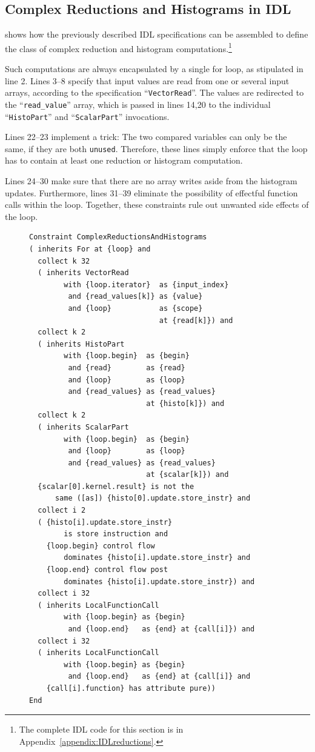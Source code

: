 \subsection{Complex Reductions and Histograms in IDL}

     shows how the previously described IDL specifications
    can be assembled to define the class of complex reduction and histogram
    computations.\footnote{The complete IDL code for this section is in
    Appendix~\ref{appendix:IDLreductions}.}

    Such computations are always encapsulated by a single for loop, as
    stipulated in line 2.
    Lines 3--8 specify that input values are read from one or several input
    arrays, according to the specification ``{\tt VectorRead}''.
    The values are redirected to the ``{\tt read\_value}'' array, which is
    passed in lines 14,20 to the individual ``{\tt HistoPart}'' and
    ``{\tt ScalarPart}'' invocations.

    Lines 22--23 implement a trick: The two compared variables can only be the
    same, if they are both {\tt unused}.
    Therefore, these lines simply enforce that the loop has to contain at least
    one reduction or histogram computation.

    Lines 24--30 make sure that there are no array writes aside from the
    histogram updates.
    Furthermore, lines 31--39 eliminate the possibility of effectful function
    calls within the loop.
    Together, these constraints rule out unwanted side effects of the loop.

\begin{figure}[p]
\begin{lstlisting}[language=IDL,label={IDLcomplexred},caption=
   {Complex reductions and histograms as an IDL specification}]
Constraint ComplexReductionsAndHistograms
( inherits For at {loop} and
  collect k 32
  ( inherits VectorRead
        with {loop.iterator}  as {input_index}
         and {read_values[k]} as {value}
         and {loop}           as {scope}
                              at {read[k]}) and
  collect k 2
  ( inherits HistoPart
        with {loop.begin}  as {begin}
         and {read}        as {read}
         and {loop}        as {loop}
         and {read_values} as {read_values}
                           at {histo[k]}) and
  collect k 2
  ( inherits ScalarPart
        with {loop.begin}  as {begin}
         and {loop}        as {loop}
         and {read_values} as {read_values}
                           at {scalar[k]}) and
  {scalar[0].kernel.result} is not the
      same ([as]) {histo[0].update.store_instr} and
  collect i 2
  ( {histo[i].update.store_instr}
        is store instruction and
    {loop.begin} control flow
        dominates {histo[i].update.store_instr} and
    {loop.end} control flow post
        dominates {histo[i].update.store_instr}) and
  collect i 32
  ( inherits LocalFunctionCall
        with {loop.begin} as {begin}
         and {loop.end}   as {end} at {call[i]}) and
  collect i 32
  ( inherits LocalFunctionCall
        with {loop.begin} as {begin}
         and {loop.end}   as {end} at {call[i]} and
    {call[i].function} has attribute pure))
End
\end{lstlisting}
\end{figure}

